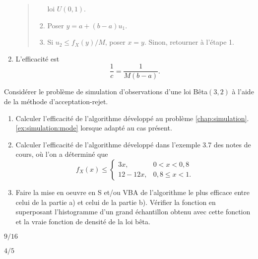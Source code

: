 \begin{exercice}
\begin{sol}
\begin{enumerate}
\begin{quote}
\begin{enumerate}[1.]
          loi $U(0, 1)$.
        \item Poser $y = a + (b - a) u_1$.
        \item Si $u_2 \leq f_X(y)/M$, poser $x = y$. Sinon, retourner
          à l'étape 1.
        \end{enumerate}
      \end{quote}
    \item L'efficacité est
      \begin{displaymath}
        \frac{1}{c} = \frac{1}{M (b - a)}.
      \end{displaymath}
    \end{enumerate}
  \end{sol}
\end{exercice}

\begin{exercice}
  \label{ex:simulation:beta}
  Considérer le problème de simulation d'observations d'une loi
  Bêta$(3, 2)$ à l'aide de la méthode d'acceptation-rejet.
  \begin{enumerate}
  \item Calculer l'efficacité de l'algorithme développé au problème
    \ref{chap:simulation}.\ref{ex:simulation:mode} lorsque adapté au
    cas présent.
  \item Calculer l'efficacité de l'algorithme développé dans l'exemple
    3.7 des notes de cours, où l'on a déterminé que
    \begin{displaymath}
      f_{X}(x) \leq
      \begin{cases}
        3x, & 0 < x < 0,8 \\
        12 - 12 x, & 0,8 \leq x < 1.
      \end{cases}
    \end{displaymath}
  \item Faire la mise en oeuvre en S et/ou VBA de l'algorithme le plus
    efficace entre celui de la partie a) et celui de la partie b).
    Vérifier la fonction en superposant l'histogramme d'un grand
    échantillon obtenu avec cette fonction et la vraie fonction de
    densité de la loi bêta.
  \end{enumerate}
  \begin{rep}
    \begin{inparaenum}
    \item $9/16$
    \item $4/5$
    \end{inparaenum}
  \end{rep}
  \begin{sol}

\end{sol}
\end{exercice}

